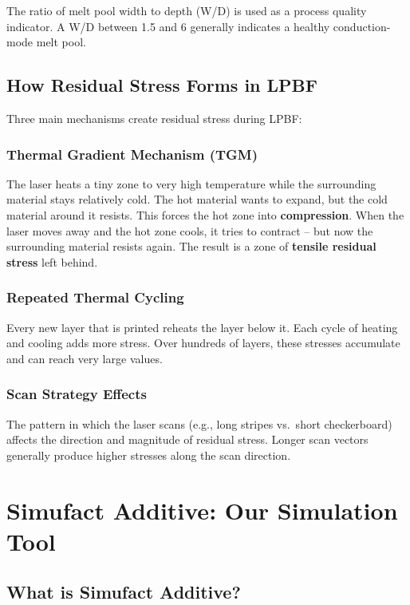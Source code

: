 \documentclass[12pt,a4paper]{report}
\begin{document}
The ratio of melt pool width to depth (W/D) is used as a process quality indicator. A W/D between 1.5 and 6 generally indicates a healthy conduction-mode melt pool.

\section{How Residual Stress Forms in LPBF}

Three main mechanisms create residual stress during LPBF:

\subsection{Thermal Gradient Mechanism (TGM)}
The laser heats a tiny zone to very high temperature while the surrounding material stays relatively cold. The hot material wants to expand, but the cold material around it resists. This forces the hot zone into \textbf{compression}. When the laser moves away and the hot zone cools, it tries to contract -- but now the surrounding material resists again. The result is a zone of \textbf{tensile residual stress} left behind.

\subsection{Repeated Thermal Cycling}
Every new layer that is printed reheats the layer below it. Each cycle of heating and cooling adds more stress. Over hundreds of layers, these stresses accumulate and can reach very large values.

\subsection{Scan Strategy Effects}
The pattern in which the laser scans (e.g., long stripes vs.\ short checkerboard) affects the direction and magnitude of residual stress. Longer scan vectors generally produce higher stresses along the scan direction.

\chapter{Simufact Additive: Our Simulation Tool}

\section{What is Simufact Additive?}
\end{document}

